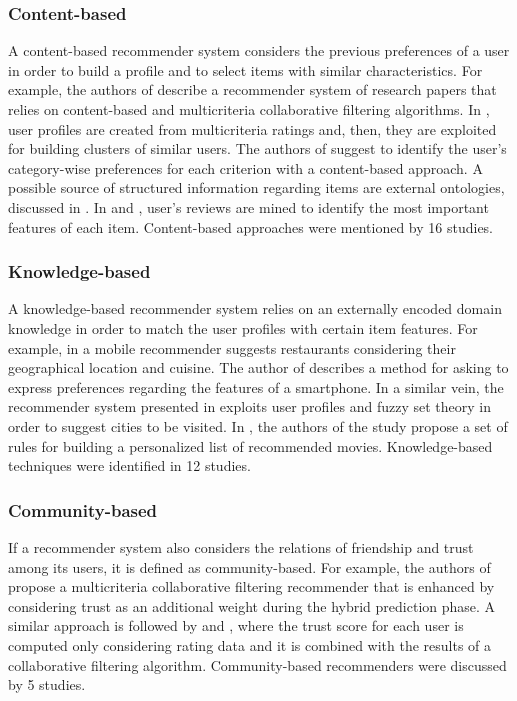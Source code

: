 \subsubsection{Content-based}

A content-based recommender system considers the previous preferences of a user in order to build a profile and to select items with similar characteristics. For example, the authors of  describe a recommender system of research papers that relies on content-based and multicriteria collaborative filtering algorithms. In , user profiles are created from multicriteria ratings and, then, they are exploited for building clusters of similar users. The authors of  suggest to identify the user's category-wise preferences for each criterion with a content-based approach. A possible source of structured information regarding items are external ontologies,  discussed in . In  and , user's reviews are mined to identify the most important features of each item. Content-based approaches were mentioned by 16 studies.

\subsubsection{Knowledge-based}

A knowledge-based recommender system relies on an externally encoded domain knowledge in order to match the user profiles with certain item features. For example, in  a mobile recommender suggests restaurants considering their geographical location and cuisine. The author of  describes a method for asking  to express  preferences regarding the features of a smartphone. In a similar vein, the recommender system presented in  exploits user profiles and fuzzy set theory in order to suggest cities to be visited. In , the authors of the study propose a set of rules for building a personalized list of recommended movies. Knowledge-based techniques were identified in 12 studies.

\subsubsection{Community-based}

If a recommender system also considers the relations of friendship and trust among its users, it is defined as community-based. For example, the authors of  propose a multicriteria collaborative filtering recommender that is enhanced by considering trust as an additional weight during the hybrid prediction phase. A similar approach is followed by  and , where the trust score for each user is computed only considering rating data and it is combined with the results of a collaborative filtering algorithm. Community-based recommenders were discussed by 5 studies.

